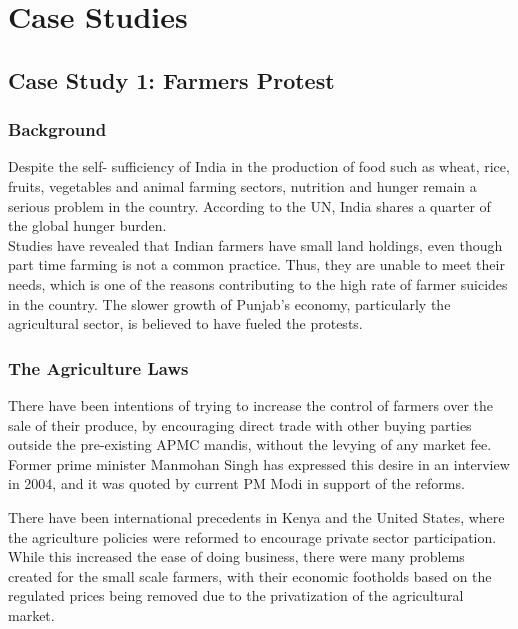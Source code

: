 \documentclass{article}
\begin{document}
\newpage
\section{Case Studies}
\subsection{Case Study 1: Farmers Protest}
\subsubsection{Background}
Despite the self- sufficiency of India in the production of food such as wheat, rice, fruits, vegetables and animal farming sectors, nutrition and hunger remain a serious problem in the country. According to the UN, India shares a quarter of the global hunger burden. \\
Studies have revealed that Indian farmers have small land holdings, even though part time farming is not a common practice. Thus, they are unable to meet their needs, which is one of the reasons contributing to the high rate of farmer suicides in the country. The slower growth of Punjab’s economy, particularly the agricultural sector, is believed to have fueled the protests.
\subsubsection{The Agriculture Laws}
There have been intentions of trying to increase the control of farmers over the sale of their produce, by encouraging direct trade with other buying parties outside the pre-existing APMC mandis, without the levying of any market fee. Former prime minister Manmohan Singh has expressed this desire in an interview in 2004, and it was quoted by current PM Modi in support of the reforms.

There have been international precedents in Kenya and the United States, where the agriculture policies were reformed to encourage private sector participation. While this increased the ease of doing business, there were many problems created for the small scale farmers, with their economic footholds based on the regulated prices being removed due to the privatization of the agricultural market.
\end{document}
